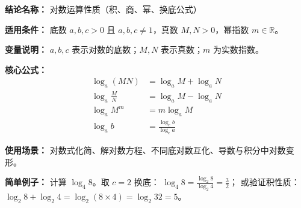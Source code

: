 \textbf{结论名称：} 对数运算性质（积、商、幂、换底公式）

\textbf{适用条件：} 底数 $a,b,c>0$ 且 $a,b,c\neq 1$，真数 $M,N>0$，幂指数 $m\in\mathbb{R}$。

\textbf{变量说明：} $a,b,c$ 表示对数的底数；$M,N$ 表示真数；$m$ 为实数指数。

\textbf{核心公式：}
\[
\boxed{
\begin{aligned}
\log_a(MN) &= \log_a M + \log_a N \\[2pt]
\log_a\frac{M}{N} &= \log_a M - \log_a N \\[2pt]
\log_a M^m &= m\log_a M \\[2pt]
\log_a b &= \frac{\log_c b}{\log_c a}
\end{aligned}
}
\]

\textbf{使用场景：} 对数式化简、解对数方程、不同底对数互化、导数与积分中对数变形。

\textbf{简单例子：} 
计算 $\log_4 8$。取 $c=2$ 换底：
$\displaystyle \log_4 8 = \frac{\log_2 8}{\log_2 4} = \frac{3}{2}$；
或验证积性质：$\log_2 8 + \log_2 4 = \log_2(8\times4) = \log_2 32 = 5$。